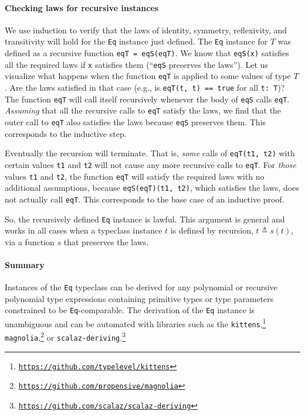 \paragraph{Checking laws for recursive instances}

We use induction to verify that the laws of identity, symmetry, reflexivity,
and transitivity will hold for the \lstinline!Eq! instance just defined.
The \lstinline!Eq! instance for $T$ was defined as a recursive function
\lstinline!eqT = eqS(eqT)!. We know that \lstinline!eqS(x)! satisfies
all the required laws if \lstinline!x! satisfies them (\textsf{``}\lstinline!eqS!
preserves the laws\textsf{''}). Let us visualize what happens when the function
\lstinline!eqT! is applied to some values of type $T$. Are the laws
satisfied in that case (e.g., is \lstinline!eqT(t, t) == true! for
all \lstinline!t: T!)? The function \lstinline!eqT! will call itself
recursively whenever the body of \lstinline!eqS! calls \lstinline!eqT!.
\emph{Assuming} that all the recursive calls to \lstinline!eqT! satisfy
the laws, we find that the outer call to \lstinline!eqT! also satisfies
the laws because \lstinline!eqS! preserves them. This corresponds
to the inductive step.

Eventually the recursion will terminate. That is, \emph{some} calls
of \lstinline!eqT(t1, t2)! with certain values \lstinline!t1! and
\lstinline!t2! will not cause any more recursive calls to \lstinline!eqT!.
For \emph{those} values \lstinline!t1! and \lstinline!t2!, the function
\lstinline!eqT! will satisfy the required laws with no additional
assumptions, because \lstinline!eqS(eqT)(t1, t2)!, which satisfies
the laws, does not actually call \lstinline!eqT!. This corresponds
to the base case of an inductive proof. 

So, the recursively defined \lstinline!Eq! instance is lawful. This
argument is general and works in all cases when a typeclass instance
$t$ is defined by recursion, $t\triangleq s(t)$, via a function
$s$ that preserves the laws.

\paragraph{Summary}

Instances of the \lstinline!Eq! typeclass can be derived for any
polynomial or recursive polynomial type expressions containing primitive
types or type parameters constrained to be \lstinline!Eq!-comparable.
The derivation of the \lstinline!Eq! instance is unambiguous and
can be automated with libraries such as the \texttt{kittens},\footnote{\texttt{\href{https://github.com/typelevel/kittens}{https://github.com/typelevel/kittens}}}
\texttt{magnolia},\footnote{\texttt{\href{https://github.com/propensive/magnolia}{https://github.com/propensive/magnolia}}}
or \texttt{scalaz-deriving}.\footnote{\texttt{\href{https://github.com/scalaz/scalaz-deriving}{https://github.com/scalaz/scalaz-deriving}}}

